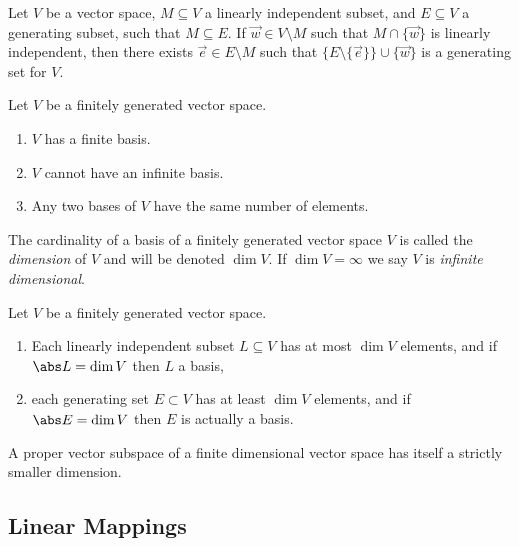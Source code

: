 \documentclass{article}
\begin{document}
\begin{lemma}
    Let $V$ be a vector space, $M\subseteq V$ a linearly independent subset, and
    $E\subseteq V$ a generating subset, such that $M\subseteq E$. If $\vec w\in V\setminus M$
    such that $M\cap\{\vec w\}$ is linearly independent, then there exists
    $\vec e\in E\setminus M$ such that $\{E\setminus\{\vec e\}\}\cup \{\vec w\}$ is a
    generating set for $V$.
\end{lemma}

\begin{corollary}[Notes 1.6.4]
    Let $V$ be a finitely generated vector space.
    \begin{enumerate}
        \item $V$ has a finite basis.
        \item $V$ cannot have an infinite basis.
        \item Any two bases of $V$ have the same number of elements.
    \end{enumerate}
\end{corollary}

\begin{definition}
    The cardinality of a basis of a finitely generated vector space $V$
    is called the \emph{dimension} of $V$ and will be denoted $\dim V$.
    If $\dim V=\infty$ we say $V$ is \emph{infinite dimensional}.
\end{definition}

\begin{corollary}[Notes 1.6.7]
    Let $V$ be a finitely generated vector space.
    \begin{enumerate}
        \item Each linearly independent subset $L\subseteq V$ has at most
              $\dim V$ elements, and if $\abs L=\dim V$ then $L$ a basis,
        \item each generating set $E\subset V$ has at least $\dim V$ elements,
              and if $\abs E=\dim V$ then $E$ is actually a basis.
    \end{enumerate}
\end{corollary}

\begin{corollary}[Notes 1.6.8]
    A proper vector subspace of a finite dimensional vector space has itself a
    strictly smaller dimension.
\end{corollary}

\subsection{Linear Mappings}
\end{document}
